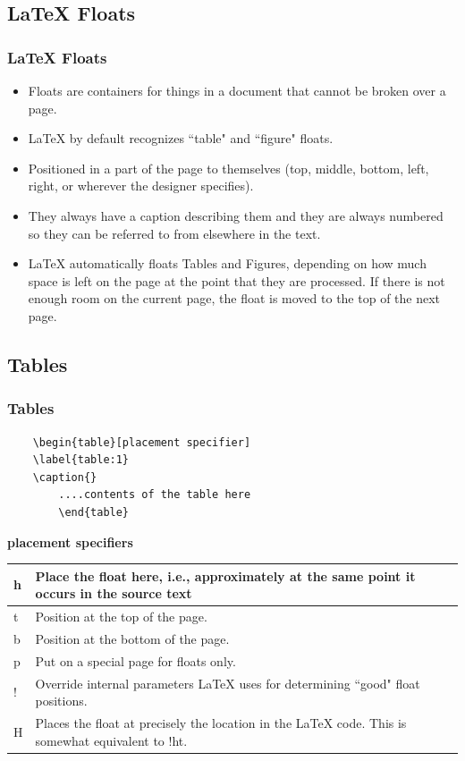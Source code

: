 \documentclass[12pt]{beamer}
\begin{document}
\begin{frame}
\section{\LaTeX{} Floats}
\frametitle{\LaTeX{} Floats}
	\begin{itemize}\justifying
		\item Floats are containers for things in a document that cannot be broken over a page.
		\item \LaTeX{} by default recognizes ``table" and ``figure" floats.
		\item Positioned in a part of the page to themselves (top, middle, bottom, left, right, or wherever the designer specifies). 
		\item They always have a caption describing them and they are always numbered so they can be referred to from elsewhere in the text. 
		\item LaTeX automatically floats Tables and Figures, depending on how much space is left on the page at the point that they are processed. If there is not enough room on the current page, the float is moved to the top of the next page. 
	\end{itemize}
\end{frame}
\begin{frame}[fragile]
\section{ Tables        }
\frametitle{Tables}
			\begin{verbatim}
	\begin{table}[placement specifier]
	\label{table:1}
	\caption{}
		....contents of the table here
		\end{table}
	\end{verbatim} 
\begin{center}
	\textbf{placement specifiers}
\end{center}
\renewcommand{\arraystretch}{1.05}
\begin{tabular}{lp{}}
	\hline
	h 	&Place the float here, i.e., approximately at the same point it occurs in the source text \\\hline
	t 	&Position at the top of the page.\\\hline
	b 	&Position at the bottom of the page.\\\hline
	p 	&Put on a special page for floats only.\\\hline
	! 	&Override internal parameters LaTeX uses for determining ``good" float positions.\\\hline
	H 	&Places the float at precisely the location in the LaTeX code. This is somewhat equivalent to !ht.\\\hline
\end{tabular}
\end{frame}
\end{document}
